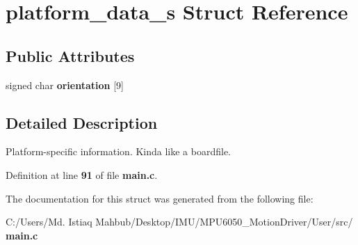 \section{platform\+\_\+data\+\_\+s Struct Reference}
\label{structplatform__data__s}
\subsection*{Public Attributes}
\begin{DoxyCompactItemize}
\item 
signed char \textbf{ orientation} [9]
\end{DoxyCompactItemize}


\subsection{Detailed Description}
Platform-\/specific information. Kinda like a boardfile. 

Definition at line \textbf{ 91} of file \textbf{ main.\+c}.



The documentation for this struct was generated from the following file\+:\begin{DoxyCompactItemize}
\item 
C\+:/\+Users/\+Md. Istiaq Mahbub/\+Desktop/\+I\+M\+U/\+M\+P\+U6050\+\_\+\+Motion\+Driver/\+User/src/\textbf{ main.\+c}\end{DoxyCompactItemize}

